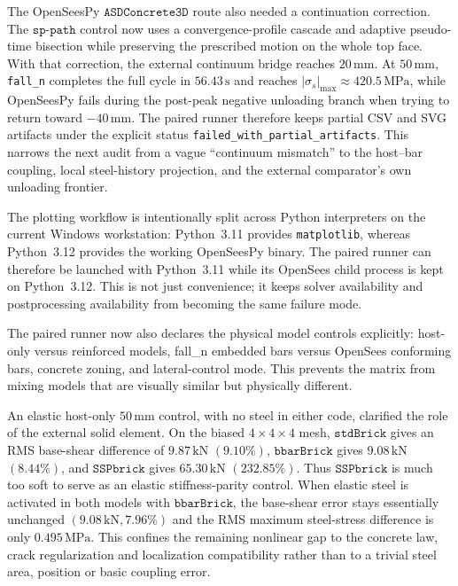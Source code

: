 The OpenSeesPy \(\texttt{ASDConcrete3D}\) route also needed a continuation
correction.  The \(\texttt{sp-path}\) control now uses a convergence-profile
cascade and adaptive pseudo-time bisection while preserving the prescribed
motion on the whole top face.  With that correction, the external continuum
bridge reaches \(20\,\mathrm{mm}\).  At \(50\,\mathrm{mm}\), \texttt{fall\_n}
completes the full cycle in \(56.43\,\mathrm{s}\) and reaches
\(|\sigma_s|_{\max}\approx 420.5\,\mathrm{MPa}\), while OpenSeesPy fails during
the post-peak negative unloading branch when trying to return toward
\(-40\,\mathrm{mm}\).  The paired runner therefore keeps partial CSV and SVG
artifacts under the explicit status \texttt{failed\_with\_partial\_artifacts}.
This narrows the next audit from a vague ``continuum mismatch'' to the
host--bar coupling, local steel-history projection, and the external
comparator's own unloading frontier.

The plotting workflow is intentionally split across Python interpreters on the
current Windows workstation: Python~3.11 provides \texttt{matplotlib}, whereas
Python~3.12 provides the working OpenSeesPy binary.  The paired runner can
therefore be launched with Python~3.11 while its OpenSees child process is
kept on Python~3.12.  This is not just convenience; it keeps solver
availability and postprocessing availability from becoming the same failure
mode.

The paired runner now also declares the physical model controls explicitly:
host-only versus reinforced models, fall\_n embedded bars versus OpenSees
conforming bars, concrete zoning, and lateral-control mode. This prevents the
matrix from mixing models that are visually similar but physically different.

An elastic host-only \(50\,\mathrm{mm}\) control, with no steel in either code,
clarified the role of the external solid element. On the biased
\(4\times4\times4\) mesh, \(\texttt{stdBrick}\) gives an RMS base-shear
difference of \(9.87\,\mathrm{kN}\) \((9.10\%)\), \(\texttt{bbarBrick}\) gives
\(9.08\,\mathrm{kN}\) \((8.44\%)\), and \(\texttt{SSPbrick}\) gives
\(65.30\,\mathrm{kN}\) \((232.85\%)\). Thus \(\texttt{SSPbrick}\) is much too
soft to serve as an elastic stiffness-parity control. When elastic steel is
activated in both models with \(\texttt{bbarBrick}\), the base-shear error
stays essentially unchanged \((9.08\,\mathrm{kN}, 7.96\%)\) and the RMS
maximum steel-stress difference is only \(0.495\,\mathrm{MPa}\). This confines
the remaining nonlinear gap to the concrete law, crack regularization and
localization compatibility rather than to a trivial steel area, position or
basic coupling error.

